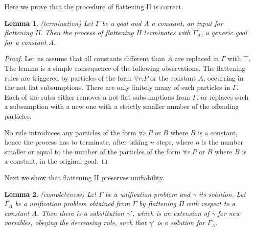 \documentclass{article}
\newtheorem{lemma}{Lemma}
\begin{document}
Here we prove that the procedure of flattening II is correct.

\begin{lemma}(termination)  \label{lemma:fltwotermination}
	Let $\Gamma$ be a goal and $A$ a constant, an input for flattening II. Then the process of flattening II terminates
	with $\Gamma_A$, a generic goal for a constant $A$.
	\end{lemma}

\begin{proof}
	Let us assume that all constants different than $A$ are replaced in $\Gamma$ with $\top$.
	The lemma is a simple consequence of the following observations. The flattening rules are triggered by
	particles of the form $\forall r.P$ or  the constant $A$, occurring in the not flat subsumptions.
	There are only finitely many of such particles in $\Gamma$. 
	Each of the rules either removes a not flat subsumptions from $\Gamma$, or replaces such a subsumption
	with a new one with a strictly smaller number of the offending particles.
	
	No rule introduces any particles of the form  $\forall r.P$ or $B$ where $B$ is a constant, hence the process has to terminate, after taking $n$ steps, where $n$ is the number smaller or equal to
	the number of the particles of the form  $\forall r.P$ or $B$ where $B$ is a constant, in the original goal.	
\end{proof}

Next we show that flattening II preserves unifiability.

\begin{lemma}(completeness)  \label{lemma:fltwocompleteness}
	Let $\Gamma$ be a unification problem and $\gamma$ its solution.
	Let $\Gamma_A$ be a unification problem obtained from $\Gamma$ by flattening II with respect to a constant $A$.
	Then there is a substitution $\gamma'$, which is an extension of $\gamma$ for new variables,
	obeying the decreasing rule, such that $\gamma'$ is a solution for $\Gamma_A$.
\end{lemma}
\end{document}
